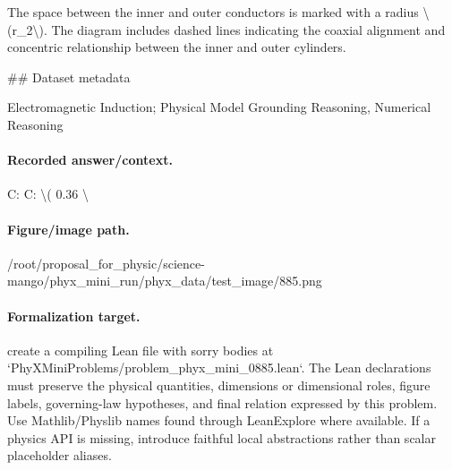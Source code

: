 The space between the inner and outer conductors is marked with a radius \textbackslash{}(r\_2\textbackslash{}). The diagram includes dashed lines indicating the coaxial alignment and concentric relationship between the inner and outer cylinders.

\#\# Dataset metadata

Electromagnetic Induction; Physical Model Grounding Reasoning, Numerical Reasoning

\paragraph{Recorded answer/context.}
C: C: \textbackslash{}( 0.36 \textbackslash{}

\paragraph{Figure/image path.}
/root/proposal\_for\_physic/science-mango/phyx\_mini\_run/phyx\_data/test\_image/885.png

\paragraph{Formalization target.}
create a compiling Lean file with sorry bodies at `PhyXMiniProblems/problem\_phyx\_mini\_0885.lean`. The Lean declarations must preserve the physical quantities, dimensions or dimensional roles, figure labels, governing-law hypotheses, and final relation expressed by this problem.
Use Mathlib/Physlib names found through LeanExplore where available. If a physics API is missing, introduce faithful local abstractions rather than scalar placeholder aliases.

